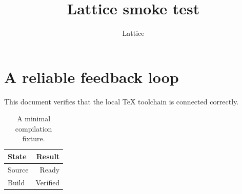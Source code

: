 \documentclass[11pt]{article}
\title{Lattice smoke test}
\author{Lattice}
\begin{document}
\maketitle
\section{A reliable feedback loop}
This document verifies that the local TeX toolchain is connected correctly.
\begin{table}[h]
  \centering
  \begin{tabular}{lr}
    \toprule
    State & Result \\
    \midrule
    Source & Ready \\
    Build & Verified \\
    \bottomrule
  \end{tabular}
  \caption{A minimal compilation fixture.}
\end{table}
\end{document}
